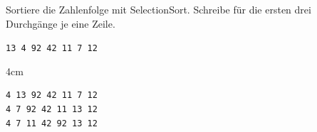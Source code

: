 \question[2]
Sortiere die Zahlenfolge mit SelectionSort.
Schreibe für die ersten drei Durchgänge je eine Zeile.

\texttt{13 4 92 42 11 7 12}

\begin{solutionbox}{4cm}
\begin{lstlisting}
4 13 92 42 11 7 12
4 7 92 42 11 13 12
4 7 11 42 92 13 12
\end{lstlisting}
\end{solutionbox}
